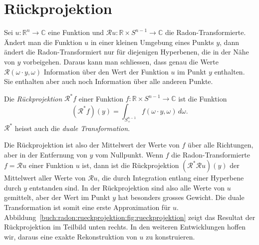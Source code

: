 %
%
%
\section{Rückprojektion
\label{buch:radon:section:rueckprojektion}}
Sei $u\colon \mathbb{R}^n\to\mathbb{C}$ eine Funktion und
$\mathscr{R}u\colon \mathbb{R}\times S^{n-1}\to\mathbb{C}$
die Radon-Transformierte.
Ändert man die Funktion $u$ in einer kleinen Umgebung eines Punkts $y$,
dann ändert die Radon-Transformiert nur für diejenigen Hyperbenen,
die in der Nähe von $y$ vorbeigehen.
Daraus kann man schliessen, dass genau die Werte
$\mathscr{R}(\omega\cdot y,\omega)$ Information über den Wert der
Funktion $u$ im Punkt $y$ enthalten.
Sie enthalten aber auch noch Information über alle anderen Punkte.

\begin{definition}[Rückprojektion]
Die {\em Rückprojektion} $\mathscr{R}^*f$ einer Funktion
%
$f\colon \mathbb{R}\times S^{n-1}\to\mathbb{C}$ ist die Funktion
\[
(\mathscr{R}^*f)(y)
=
\int_{S_+^{n-1}} f(\omega\cdot y,\omega)\,d\omega.
\]
$\mathscr{R}^*$ heisst auch die {\em duale Transformation}.
%
%
\end{definition}

Die Rückprojektion ist also der Mittelwert der Werte von $f$ über
alle Richtungen, aber in der Entfernung von $y$ vom Nullpunkt.
Wenn $f$ die Radon-Transformierte $f=\mathscr{R}u$ einer Funktion $u$
ist, dann ist die Rückprojektion $(\mathscr{R}^*\mathscr{R}u)(y)$
der Mittelwert aller Werte von $\mathscr{R}u$, die durch Integration
entlang einer Hyperbene durch $y$ entstanden sind.
In der Rückprojektion sind also alle Werte von $u$ gemittelt, aber
der Wert im Punkt $y$ hat besonders grosses Gewicht.
Die duale Transformation ist somit eine erste Approximation für $u$.
Abbildung~\ref{buch:radon:rueckprojektion:fig:rueckprojektion}
zeigt das Resultat der Rückprojektion im Teilbild unten rechts.
In den weiteren Entwicklungen hoffen wir, daraus eine exakte Rekonstruktion
von $u$ zu konstruieren.

%
%
